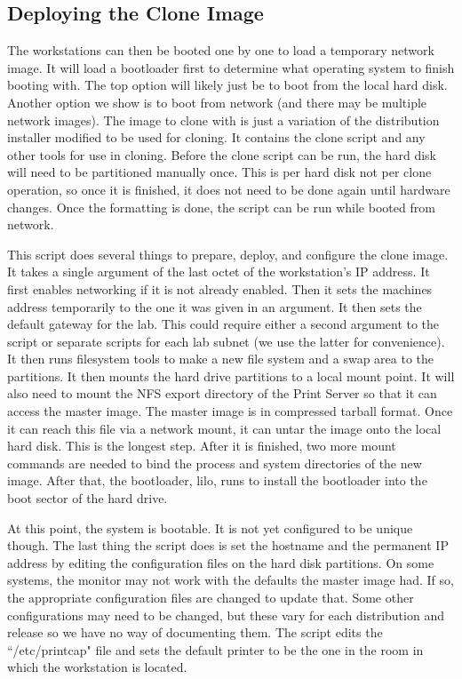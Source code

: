 \subsection{Deploying the Clone Image}
The workstations can then be booted one by one to load a temporary network image.  It will load a bootloader first to determine what operating system to finish booting with.  The top option will likely just be to boot from the local hard disk.  Another option we show is to boot from network (and there may be multiple network images).  The image to clone with is just a variation of the distribution installer modified to be used for cloning.  It contains the clone script and any other tools for use in cloning.  Before the clone script can be run, the hard disk will need to be partitioned manually once.  This is per hard disk not per clone operation, so once it is finished, it does not need to be done again until hardware changes.  Once the formatting is done, the script can be run while booted from network.

This script does several things to prepare, deploy, and configure the clone image.  It takes a single argument of the last octet of the workstation's IP address.  It first enables networking if it is not already enabled.  Then it sets the machines address temporarily to the one it was given in an argument.  It then sets the default gateway for the lab.  This could require either a second argument to the script or separate scripts for each lab subnet (we use the latter for convenience).  It then runs filesystem tools to make a new file system and a swap area to the partitions.  It then mounts the hard drive partitions to a local mount point.  It will also need to mount the NFS export directory of the Print Server so that it can access the master image.  The master image is in compressed tarball format.  Once it can reach this file via a network mount, it can untar the image onto the local hard disk.  This is the longest step.  After it is finished, two more mount commands are needed to bind the process and system directories of the new image.  After that, the bootloader, lilo, runs to install the bootloader into the boot sector of the hard drive. 

At this point, the system is bootable.  It is not yet configured to be unique though.  The last thing the script does is set the hostname and the permanent IP address by editing the configuration files on the hard disk partitions.  On some systems, the monitor may not work with the defaults the master image had.  If so, the appropriate configuration files are changed to update that.  Some other configurations may need to be changed, but these vary for each distribution and release so we have no way of documenting them.  The script edits the ``/etc/printcap" file and sets the default printer to be the one in the room in which the workstation is located.

